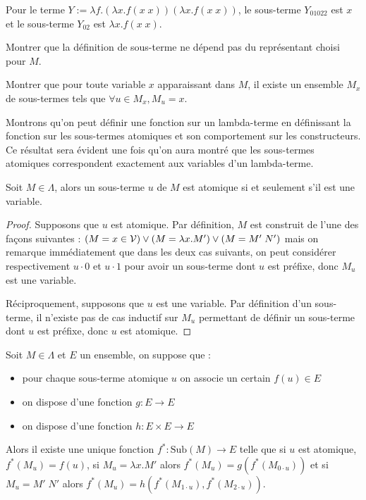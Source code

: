 \begin{expl}
    Pour le terme $Y := \lambda f.(\lambda x.f(x\;x))(\lambda x.f(x\;x))$, le sous-terme $Y_{01022}$ est $x$ et le sous-terme $Y_{02}$ est $\lambda x.f(x\;x)$.
\end{expl}

\begin{exo}
    Montrer que la définition de sous-terme ne dépend pas du représentant choisi pour $M$.
\end{exo}

\begin{exo}
    Montrer que pour toute variable $x$ apparaissant dans $M$, il existe un ensemble $M_x$ de sous-termes tels que $\forall u\in M_x, M_u = x$.
\end{exo}

Montrons qu'on peut définir une fonction sur un lambda-terme en définissant la fonction sur les sous-termes atomiques et son comportement sur les constructeurs. Ce résultat sera évident une fois qu'on aura montré que les sous-termes atomiques correspondent exactement aux variables d'un lambda-terme.

\begin{prop}
    Soit $M\in\Lambda$, alors un sous-terme $u$ de $M$ est atomique si et seulement s'il est une variable.
\end{prop}

\begin{proof}
    Supposons que $u$ est atomique. Par définition, $M$ est construit de l'une des façons suivantes : $(M = x \in\mathcal V) \lor (M = \lambda x.M')\lor (M = M'\;N')$ mais on remarque immédiatement que dans les deux cas suivants, on peut considérer respectivement $u\cdot 0$ et $u\cdot 1$ pour avoir un sous-terme dont $u$ est préfixe, donc $M_u$ est une variable.

    Réciproquement, supposons que $u$ est une variable. Par définition d'un sous-terme, il n'existe pas de cas inductif sur $M_u$ permettant de définir un sous-terme dont $u$ est préfixe, donc $u$ est atomique.
\end{proof}

\begin{prop}
    Soit $M\in\Lambda$ et $E$ un ensemble, on suppose que :
    \begin{itemize}[label=$\bullet$]
        \item pour chaque sous-terme atomique $u$ on associe un certain $f(u)\in E$
        \item on dispose d'une fonction $g : E \to E$
        \item on dispose d'une fonction $h : E \times E \to E$
    \end{itemize} 
    Alors il existe une unique fonction $f^* : \mathrm{Sub}(M)\to E$ telle que si $u$ est atomique, $f^*(M_u) = f(u)$, si $M_u = \lambda x. M'$ alors $f^*(M_u) = g(f^*(M_{0\cdot u}))$ et si $M_u = M'\;N'$ alors $f^*(M_u) = h(f^*(M_{1\cdot u}),f^*(M_{2\cdot u}))$.
\end{prop}

